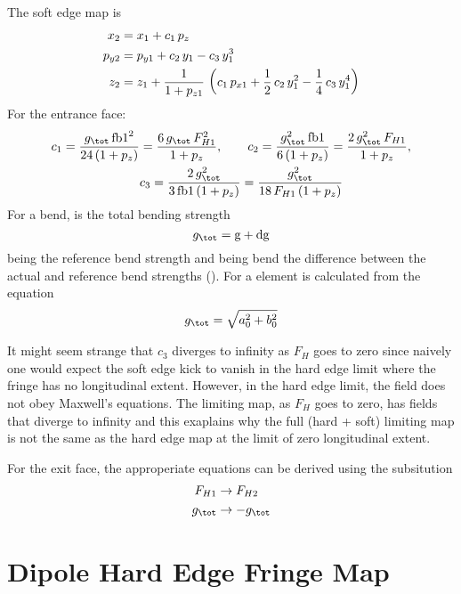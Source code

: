 The soft edge map is
\begin{align}
  x_2 &=  x_1 + c_1 \, p_z \nonumber \\
  p_{y2} &= p_{y1} + c_2 \, y_1 - c_3 \, y_1^3 \\
  z_2 &= z_1 + \frac{1}{1 + p_{z1}} \, \left( 
    c_1 \, p_{x1} + \frac{1}{2} \, c_2 \, y_1^2 -\frac{1}{4} \, c_3 \, y_1^4 \right)
    \nonumber
\end{align}
For the entrance face:
\begin{align}
  c_1 = \frac{g_\tot \, \text{fb1}^2}{24 \, (1 + p_z)} &= \frac{6 \, g_\tot \, F_{H1}^2}{1 + p_z}, \qquad 
  c_2 = \frac{g_\tot^2 \, \text{fb1}}{6 \, (1 + p_z)} = \frac{2 \, g_\tot^2 \, F_{H1}}{1 + p_z}, \CRNO
  &c_3 = \frac{2 \, g_\tot^2}{3 \, \text{fb1} \, (1 + p_z)} = \frac{g_\tot^2}{18 \, F_{H1} \, (1 + p_z)}
\end{align}
For a bend,  is the total bending strength
\begin{equation}
  g_\tot = \text{g} + \text{dg}
\end{equation}
 being the reference bend strength and  being bend the difference between the actual
and reference bend strengths (). For a  element  is calculated
from the equation
\begin{equation}
  g_\tot = \sqrt{a_0^2 + b_0^2}
\end{equation}

It might seem strange that $c_3$ diverges to infinity as $F_H$ goes to zero since naively one would
expect the soft edge kick to vanish in the hard edge limit where the fringe has no longitudinal
extent. However, in the hard edge limit, the field does not obey Maxwell's equations. The limiting
map, as $F_H$ goes to zero, has fields that diverge to infinity and this exaplains why the full
(hard + soft) limiting map is not the same as the hard edge map at the limit of zero longitudinal
extent.

For the exit face, the approperiate equations can be derived using the subsitution
\begin{align}
  F_{H1} &\rightarrow F_{H2} \CRNO
  g_\tot &\rightarrow -g_\tot
\end{align}

\section{Dipole Hard Edge Fringe Map}
\label{s:fringe.bend.hard}

